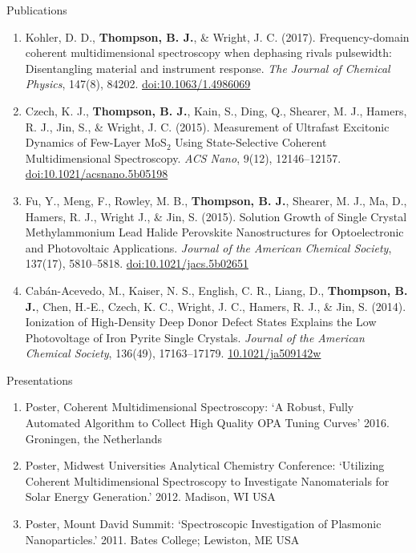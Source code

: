 \documentclass{resume}  %
\begin{document}
\begin{rSection}{Publications}
 
\begin{enumerate}[leftmargin = 0 pt]

  
\item Kohler, D. D., \textbf{Thompson, B. J.}, \& Wright, J. C. (2017). Frequency-domain
  coherent multidimensional spectroscopy when dephasing rivals pulsewidth:
  Disentangling material and instrument response.
  \textit{The Journal of Chemical Physics},
  147(8), 84202.
  \href{https://doi.org/10.1063/1.4986069}{doi:10.1063/1.4986069}

\item Czech, K. J., \textbf{Thompson, B. J.}, Kain, S., Ding, Q., Shearer, M. J., Hamers,
  R. J., Jin, S., \& Wright, J. C. (2015). Measurement of Ultrafast Excitonic Dynamics of
  Few-Layer MoS$_2$ Using State-Selective Coherent Multidimensional Spectroscopy.
  \textit{ACS Nano},
  9(12), 12146–12157.
  \href{https://doi.org/10.1021/acsnano.5b05198}{doi:10.1021/acsnano.5b05198}

\item Fu, Y., Meng, F., Rowley, M. B., \textbf{Thompson, B. J.}, Shearer, M. J.,
  Ma, D., Hamers, R. J., Wright J., \& Jin, S. (2015). Solution Growth of Single Crystal
  Methylammonium Lead Halide Perovskite Nanostructures for Optoelectronic and
  Photovoltaic Applications.
  \textit{Journal of the American Chemical Society},
  137(17), 5810–5818.
  \href{https://doi.org/10.1021/jacs.5b02651}{doi:10.1021/jacs.5b02651}


\item Cabán-Acevedo, M., Kaiser, N. S., English, C. R., Liang, D., \textbf{Thompson, B. J.},
  Chen, H.-E., Czech, K. C., Wright, J. C., Hamers, R. J., \& Jin, S. (2014).
  Ionization of High-Density Deep Donor Defect States Explains the Low
  Photovoltage of Iron Pyrite Single Crystals.
  \textit{Journal of the American Chemical Society},
  136(49), 17163–17179.
  \href{https://doi.org/10.1021/ja509142w}{10.1021/ja509142w}

\end{enumerate}

\end{rSection}

\begin{rSection}{Presentations}

\begin{enumerate}[leftmargin = 0 pt]
\item Poster, Coherent Multidimensional Spectroscopy: `A Robust, Fully Automated Algorithm to Collect High Quality OPA Tuning Curves' 2016. Groningen, the Netherlands
\item Poster, Midwest Universities Analytical Chemistry Conference:
`Utilizing Coherent Multidimensional Spectroscopy to Investigate Nanomaterials for Solar Energy Generation.'
2012. Madison, WI USA
\item Poster, Mount David Summit:
`Spectroscopic Investigation of Plasmonic Nanoparticles.'
2011. Bates College; Lewiston, ME USA
\end{enumerate}

\end{rSection}
\end{document}
